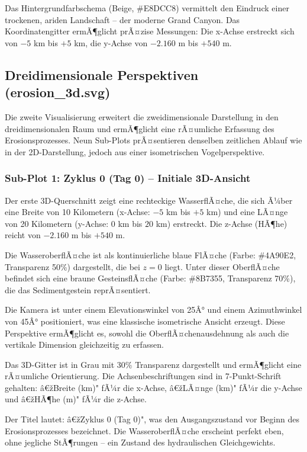 Das Hintergrundfarbschema (Beige, \#E8DCC8) vermittelt den Eindruck einer trockenen, ariden Landschaft -- der moderne Grand Canyon. Das Koordinatengitter ermÃ¶glicht prÃ¤zise Messungen: Die x-Achse erstreckt sich von $-5$ km bis $+5$ km, die y-Achse von $-2.160$ m bis $+540$ m.

\subsection{Dreidimensionale Perspektiven (erosion\_3d.svg)}

Die zweite Visualisierung erweitert die zweidimensionale Darstellung in den dreidimensionalen Raum und ermÃ¶glicht eine rÃ¤umliche Erfassung des Erosionsprozesses. Neun Sub-Plots prÃ¤sentieren denselben zeitlichen Ablauf wie in der 2D-Darstellung, jedoch aus einer isometrischen Vogelperspektive.

\subsubsection*{Sub-Plot 1: Zyklus 0 (Tag 0) -- Initiale 3D-Ansicht}

Der erste 3D-Querschnitt zeigt eine rechteckige WasserflÃ¤che, die sich Ã¼ber eine Breite von 10 Kilometern (x-Achse: $-5$ km bis $+5$ km) und eine LÃ¤nge von 20 Kilometern (y-Achse: $0$ km bis $20$ km) erstreckt. Die z-Achse (HÃ¶he) reicht von $-2.160$ m bis $+540$ m.

Die WasseroberflÃ¤che ist als kontinuierliche blaue FlÃ¤che (Farbe: \#4A90E2, Transparenz 50\%) dargestellt, die bei $z = 0$ liegt. Unter dieser OberflÃ¤che befindet sich eine braune GesteinsflÃ¤che (Farbe: \#8B7355, Transparenz 70\%), die das Sedimentgestein reprÃ¤sentiert.

Die Kamera ist unter einem Elevationswinkel von 25Â° und einem Azimuthwinkel von 45Â° positioniert, was eine klassische isometrische Ansicht erzeugt. Diese Perspektive ermÃ¶glicht es, sowohl die OberflÃ¤chenausdehnung als auch die vertikale Dimension gleichzeitig zu erfassen.

Das 3D-Gitter ist in Grau mit 30\% Transparenz dargestellt und ermÃ¶glicht eine rÃ¤umliche Orientierung. Die Achsenbeschriftungen sind in 7-Punkt-Schrift gehalten: â€žBreite (km)" fÃ¼r die x-Achse, â€žLÃ¤nge (km)" fÃ¼r die y-Achse und â€žHÃ¶he (m)" fÃ¼r die z-Achse.

Der Titel lautet: â€žZyklus 0 (Tag 0)", was den Ausgangszustand vor Beginn des Erosionsprozesses bezeichnet. Die WasseroberflÃ¤che erscheint perfekt eben, ohne jegliche StÃ¶rungen -- ein Zustand des hydraulischen Gleichgewichts.

